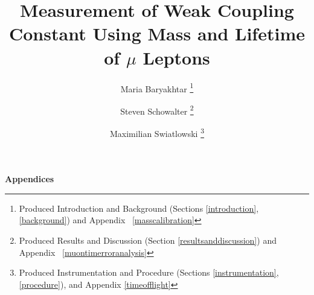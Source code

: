 \documentclass[psfig,12pt,notitlepage]{article}
\begin{document}
\title{Measurement of Weak Coupling Constant Using Mass and Lifetime
of $\mu$ Leptons} \author{Maria Baryakhtar \footnote{Produced
Introduction and Background (Sections \ref{introduction},
\ref{background}) and Appendix ~\ref{masscalibration}} \and Steven
Schowalter \footnote{Produced Results and Discussion (Section
\ref{resultsanddiscussion}) and Appendix ~\ref{muontimerroranalysis}}
\and Maximilian Swiatlowski
\footnote{Produced Instrumentation and Procedure (Sections
\ref{instrumentation}, \ref{procedure}), and Appendix
\ref{timeofflight}}}

\maketitle
\thispagestyle{empty}



\clearpage
\tableofcontents
\setcounter{tocdepth}{2}


\clearpage












\newpage

\appendix

\begin{center}
\begin{Large}
\bfseries{Appendices}
\end{Large}
\end{center}







\end{document}
